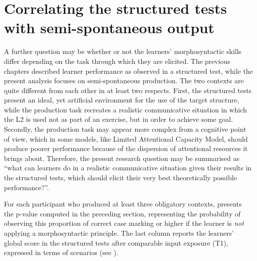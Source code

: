 \section{Correlating the structured tests with semi-spontaneous output}\label{sec:07:4}

A further question may be whether or not the learners’ morphosyntactic skills differ depending on the task through which they are elicited. The previous chapters described learner performance as observed in a structured test, while the present analysis focuses on semi-spontaneous production. The two contexts are quite different from each other in at least two respects. First, the structured tests present an ideal, yet artificial environment for the use of the target structure, while the production task recreates a realistic communicative situation in which the L2 is used not as part of an exercise, but in order to achieve some goal. Secondly, the production task may appear more complex from a cognitive point of view, which in some models, like  Limited Attentional Capacity Model, should produce poorer performance because of the dispersion of attentional resources it brings about. Therefore, the present research question may be summarised as “what can learners do in a realistic communicative situation given their results in the structured tests, which should elicit their very best theoretically possible performance?”. 

For each participant who produced at least three obligatory contexts,  presents the p-value computed in the preceding section, representing the probability of observing this proportion of correct case marking or higher if the learner is \textit{not} applying a morphosyntactic principle. The last column reports the learners’ global score in the structured tests after comparable input exposure (T1), expressed in terms of scenarios (see ).

